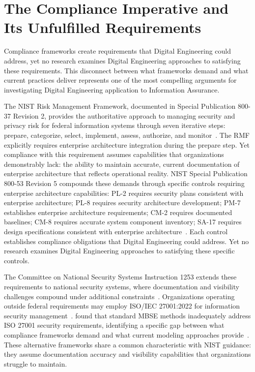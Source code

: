 \section{The Compliance Imperative and Its Unfulfilled Requirements}\label{sec:compliance_imperative}

Compliance frameworks create requirements that Digital Engineering could address, yet no research examines Digital Engineering approaches to satisfying these requirements. This disconnect between what frameworks demand and what current practices deliver represents one of the most compelling arguments for investigating Digital Engineering application to Information Assurance.

The NIST Risk Management Framework, documented in Special Publication 800-37 Revision 2, provides the authoritative approach to managing security and privacy risk for federal information systems through seven iterative steps: prepare, categorize, select, implement, assess, authorize, and monitor~\parencite{NIST_SP_800_37_R2_2018}. The RMF explicitly requires enterprise architecture integration during the prepare step. Yet compliance with this requirement assumes capabilities that organizations demonstrably lack: the ability to maintain accurate, current documentation of enterprise architecture that reflects operational reality. NIST Special Publication 800-53 Revision 5 compounds these demands through specific controls requiring enterprise architecture capabilities: PL-2 requires security plans consistent with enterprise architecture; PL-8 requires security architecture development; PM-7 establishes enterprise architecture requirements; CM-2 requires documented baselines; CM-8 requires accurate system component inventory; SA-17 requires design specifications consistent with enterprise architecture~\parencite{Force_2020}. Each control establishes compliance obligations that Digital Engineering could address. Yet no research examines Digital Engineering approaches to satisfying these specific controls.

The Committee on National Security Systems Instruction 1253 extends these requirements to national security systems, where documentation and visibility challenges compound under additional constraints~\parencite{CNSSI_1253_2022}. Organizations operating outside federal requirements may employ ISO/IEC 27001:2022 for information security management~\parencite{ISO27001-2023}. \citeauthor{Mazeika_Butleris_2020} found that standard MBSE methods inadequately address ISO 27001 security requirements, identifying a specific gap between what compliance frameworks demand and what current modeling approaches provide~\parencite{Mazeika_Butleris_2020}. These alternative frameworks share a common characteristic with NIST guidance: they assume documentation accuracy and visibility capabilities that organizations struggle to maintain.

